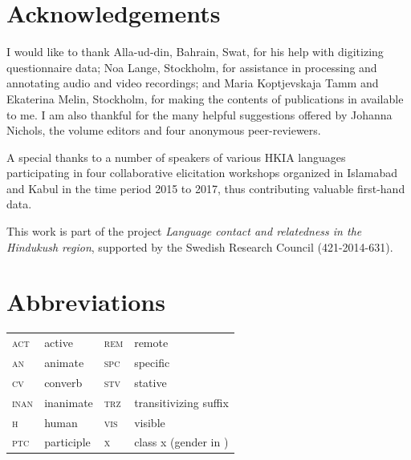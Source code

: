 \documentclass[output=collectionpaper]{langsci/langscibook}
\begin{document}
\section*{Acknowledgements}

I would like to thank Alla-ud-din, Bahrain, Swat, for his help with digitizing questionnaire data; Noa Lange, Stockholm, for assistance in processing and annotating audio and video recordings; and Maria Koptjevskaja Tamm and Ekaterina Melin, Stockholm, for making the contents of publications in  available to me. I am also thankful for the many helpful suggestions offered by Johanna Nichols, the volume editors and four anonymous peer-reviewers.

A special thanks to a number of speakers of various HKIA languages participating in four collaborative elicitation workshops organized in Islamabad and Kabul in the time period 2015 to 2017, thus contributing valuable first-hand data.

This work is part of the project \textit{Language contact and relatedness in the Hindukush region}, supported by the Swedish Research Council (421-2014-631).

\section*{Abbreviations}

\begin{tabular}{llll}
\textsc{act} 	&	 active	&	\textsc{rem} 	&	 remote	\\
\textsc{an} 	&	 animate &	\textsc{spc} 	&	 specific\\
\textsc{cv} 	&	 converb &	\textsc{stv} 	&	 stative\\
\textsc{inan} 	&	 inanimate	&	\textsc{trz} 	&	 transitivizing suffix \\
\textsc{h}& human &	\textsc{vis} 	&	 visible	\\
\textsc{ptc} &	 participle & \textsc{x} 	&	 class x (gender in	\ili{Burushaski})	\\
\end{tabular}



\begingroup
\setlength{\emergencystretch}{8em}
\printbibliography[heading=subbibliography,notkeyword=this]
\endgroup
\end{document}
